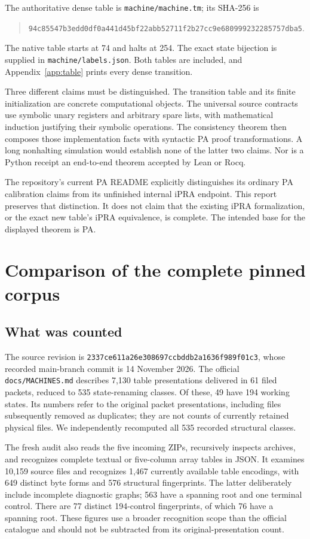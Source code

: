 \documentclass[11pt,letterpaper]{article}
\newcommand{\file}[1]{\texttt{\nolinkurl{#1}}}
\newcommand{\snapshot}{\texttt{2337ce611a26e308697ccbddb2a1636f989f01c3}}
\begin{document}
The authoritative dense table is \file{machine/machine.tm}; its SHA-256 is
\begin{quote}\small
\nolinkurl{94c85547b3edd0df0a441d45bf22abb52711f2b27cc9e680999232285757dba5}.
\end{quote}
The native table starts at 74 and halts at 254. The exact state bijection
is supplied in \file{machine/labels.json}. Both tables are included, and
Appendix~\ref{app:table} prints every dense transition.

Three different claims must be distinguished. The transition table and its
finite initialization are concrete computational objects. The universal
source contracts use symbolic unary registers and arbitrary spare lists,
with mathematical induction justifying their symbolic operations. The
consistency theorem then composes those implementation facts with syntactic
PA proof transformations. A long nonhalting simulation would establish none
of the latter two claims. Nor is a Python receipt an end-to-end theorem
accepted by Lean or Rocq.

The repository's current PA README explicitly distinguishes its ordinary
PA calibration claims from its unfinished internal iPRA endpoint. This
report preserves that distinction. It does not claim that the existing
iPRA formalization, or the exact new table's iPRA equivalence, is complete.
The intended base for the displayed theorem is PA.\cite{status}

\section{Comparison of the complete pinned corpus}
\label{sec:comparison}

\subsection{What was counted}

The source revision is \snapshot, whose recorded main-branch commit is
14 November 2026. The official \file{docs/MACHINES.md} describes 7,130
table presentations delivered in 61 filed packets, reduced to 535
state-renaming classes. Of these, 49 have 194 working states. Its numbers
refer to the original packet presentations, including files subsequently
removed as duplicates; they are not counts of currently retained physical
files. We independently recomputed all 535 recorded structural classes.\cite{catalogue}

The fresh audit also reads the five incoming ZIPs, recursively inspects
archives, and recognizes complete textual or five-column array tables in
JSON. It examines 10,159 source files and recognizes 1,467 currently
available table encodings, with 649 distinct byte forms and 576 structural
fingerprints. The latter deliberately include incomplete diagnostic graphs;
563 have a spanning root and one terminal control. There are 77 distinct
194-control fingerprints, of which 76 have a spanning root. These figures
use a broader recognition scope than the official catalogue and should not
be subtracted from its original-presentation count.
\end{document}
